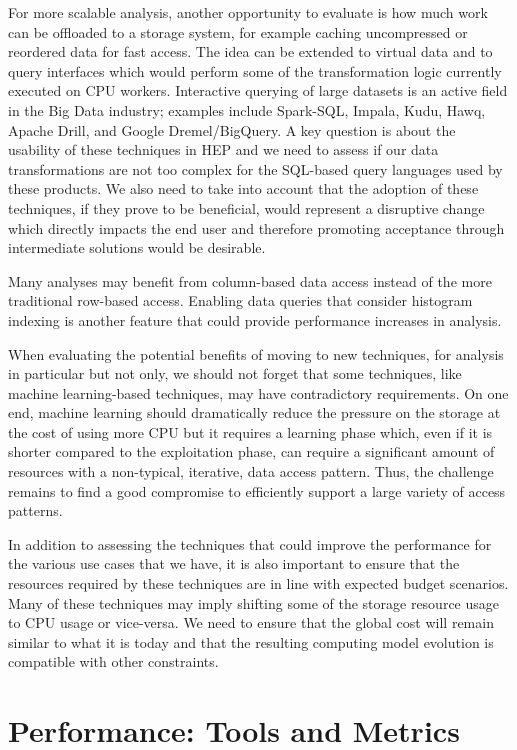 \documentclass[12pt,a4paper]{article}
\begin{document}
For more scalable analysis, another opportunity to evaluate is how much
work can be offloaded to a storage system, for example caching
uncompressed or reordered data for fast access. The idea can be extended
to virtual data and to query interfaces which would perform some of the
transformation logic currently executed on CPU workers. Interactive
querying of large datasets is an active field in the Big Data industry;
examples include Spark-SQL, Impala, Kudu, Hawq, Apache Drill, and Google
Dremel/BigQuery. A key question is about the usability of these
techniques in HEP and we need to assess if our data transformations are
not too complex for the SQL-based query languages used by these
products. We also need to take into account that the adoption of these
techniques, if they prove to be beneficial, would represent a disruptive
change which directly impacts the end user and therefore promoting
acceptance through intermediate solutions would be desirable.

Many analyses may benefit from column-based data access instead of the
more traditional row-based access. Enabling data queries that consider
histogram indexing is another feature that could provide performance
increases in analysis.

When evaluating the potential benefits of moving to new techniques, for
analysis in particular but not only, we should not forget that some
techniques, like machine learning-based techniques, may have
contradictory requirements. On one end, machine learning should
dramatically reduce the pressure on the storage at the cost of using
more CPU but it requires a learning phase which, even if it is shorter
compared to the exploitation phase, can require a significant amount of
resources with a non-typical, iterative, data access pattern. Thus, the
challenge remains to find a good compromise to efficiently support a
large variety of access patterns.

In addition to assessing the techniques that could improve the
performance for the various use cases that we have, it is also important
to ensure that the resources required by these techniques are in line
with expected budget scenarios. Many of these techniques may imply
shifting some of the storage resource usage to CPU usage or vice-versa.
We need to ensure that the global cost will remain similar to what it is
today and that the resulting computing model evolution is compatible
with other constraints.

\section{Performance: Tools and
Metrics}\label{performance-tools-and-metrics}
\end{document}
